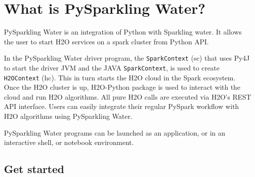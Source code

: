 \section{What is PySparkling Water?}

PySparkling Water is an integration of Python with Sparkling water. It allows the user to start H2O services on a spark cluster from Python API.

In the PySparkling Water driver program, the \texttt{SparkContext} (sc) that uses Py4J to start the driver JVM and the JAVA \texttt{SparkContext}, is used to create \texttt{H2OContext} (hc).  This in turn starts the H2O cloud in the Spark ecosystem. Once the H2O cluster is up, H2O-Python package is used to interact with the cloud and run H2O algorithms. All pure H2O calls are executed via H2O's REST API interface. Users can easily integrate their regular PySpark workflow with H2O algorithms using PySparkling Water.

PySparkling Water programs can be launched as an application, or in an interactive shell, or notebook environment.

\subsection{Get started}

